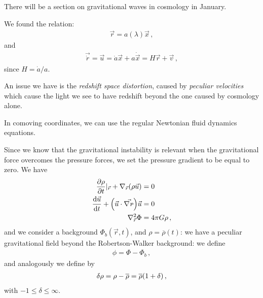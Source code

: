 \documentclass[main.tex]{subfiles}
\begin{document}

There will be a section on gravitational waves in cosmology in January. 

We found the relation: 
%
\begin{align}
  \vec{r}  = a(\lambda ) \vec{x}
\,,
\end{align}
%
and 
%
\begin{align}
  \vec{\dot{r}} = \vec{u} = \dot{a} \vec{x} + a \dot{\vec{x}} = H \vec{r} + \vec{v}
\,,
\end{align}
%
since \(H = \dot{a} / a\). 

An issue we have is the \emph{redshift space distortion}, caused by \emph{peculiar velocities} which cause the light we see to have redshift beyond the one caused by cosmology alone. 

In comoving coordinates, we can use the regular Newtonian fluid dynamics equations. 

Since we know that the gravitational instability is relevant when the gravitational force overcomes the pressure forces, we set the pressure gradient to be equal to zero. We have 
%
\begin{subequations}
\begin{align}
  \pdv{\rho }{t} |_{\vec{r}} + \nabla_{\vec{r}} \qty(\rho \vec{u}) &= 0  \\
  \dv{\vec{u}}{t} + \qty(\vec{u} \cdot \vec{\nabla_{\vec{r}}}) \vec{u} &=0  \\
  \nabla_{\vec{r}}^2 \Phi &= 4 \pi G \rho 
\,,
\end{align}
\end{subequations}
%
and we consider a background \(\Phi_b (\vec{r}, t)\), and \(\rho = \overline{\rho}(t)\): we have a peculiar gravitational field beyond the Robertson-Walker background: we define 
%
\begin{align}
  \phi  = \Phi - \Phi_b
\,,
\end{align}
%
and analogously we define by 
%
\begin{align}
  \delta \rho = \rho - \overline{\rho} = \overline{\rho} \qty(1 + \delta )
\,,
\end{align}
%
with \(-1 \leq \delta \leq \infty\). 
\end{document}
